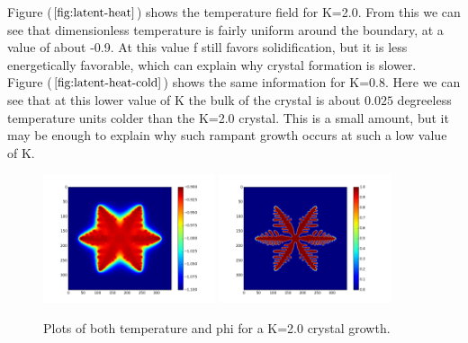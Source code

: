 \documentclass[10pt]{article} %
\begin{document}
Figure ($\ref{fig:latent-heat}$) shows the temperature field for K=2.0. From this we can see that dimensionless temperature is fairly uniform around the boundary, at a value of about -0.9. At this value f still favors solidification, but it is less energetically favorable, which can explain why crystal formation is slower. \\

Figure ($\ref{fig:latent-heat-cold}$) shows the same information for K=0.8. Here we can see that at this lower value of K the bulk of the crystal is about $0.025$ degreeless temperature units colder than the K=2.0 crystal. This is a small amount, but it may be enough to explain why such rampant growth occurs at such a low value of K.\\

\begin{figure}[h!]
  \centering
  \includegraphics[width=0.45\textwidth]{../u-field-6.png}
  \includegraphics[width=0.45\textwidth]{../phi-field-6.png}
  \caption{Plots of both temperature and phi for a K=2.0 crystal growth.}
  \label{fig:latent-heat}
\end{figure}
\end{document}
